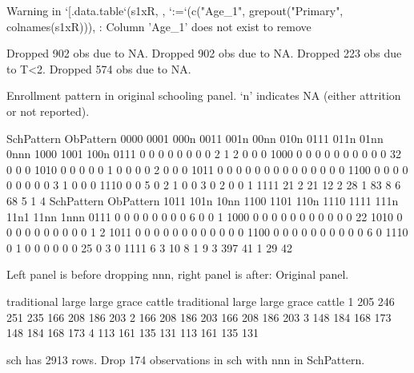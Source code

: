 \begin{Schunk}
\begin{Soutput}
Warning in `[.data.table`(s1xR, , `:=`(c("Age_1", grepout("Primary", colnames(s1xR))), : Column 'Age_1' does not exist to remove
\end{Soutput}
\begin{Soutput}
Dropped 902 obs due to NA.
Dropped 902 obs due to NA.
Dropped 223 obs due to T<2.
Dropped 574 obs due to NA.
\end{Soutput}
\end{Schunk}
Enrollment pattern in original schooling panel. `n' indicates NA (either attrition or not reported).
\begin{Schunk}
\begin{Soutput}
         SchPattern
ObPattern 0000 0001 000n 0011 001n 00nn 010n 0111 011n 01nn 0nnn 1000 1001 100n
     0111    0    0    0    0    0    0    0    0    2    1    2    0    0    0
     1000    0    0    0    0    0    0    0    0    0    0   32    0    0    0
     1010    0    0    0    0    0    1    0    0    0    0    2    0    0    0
     1011    0    0    0    0    0    0    0    0    0    0    0    0    0    0
     1100    0    0    0    0    0    0    0    0    0    3    1    0    0    0
     1110    0    0    5    0    2    1    0    0    3    0    2    0    0    1
     1111   21    2   21   12    2   28    1   83    8    6   68    5    1    4
         SchPattern
ObPattern 1011 101n 10nn 1100 1101 110n 1110 1111 111n 11n1 11nn 1nnn
     0111    0    0    0    0    0    0    0    0    6    0    0    1
     1000    0    0    0    0    0    0    0    0    0    0    0   22
     1010    0    0    0    0    0    0    0    0    0    0    1    2
     1011    0    0    0    0    0    0    0    0    0    0    0    0
     1100    0    0    0    0    0    0    0    0    0    0    6    0
     1110    0    1    0    0    0    0    0    0   25    0    3    0
     1111    6    3   10    8    1    9    3  397   41    1   29   42
\end{Soutput}
\end{Schunk}
Left panel is before dropping \textsf{nnn}, right panel is after: Original panel.
\begin{Schunk}
\begin{Soutput}
  traditional large large grace cattle traditional large large grace cattle
1         205   246         251    235         166   208         186    203
2         166   208         186    203         166   208         186    203
3         148   184         168    173         148   184         168    173
4         113   161         135    131         113   161         135    131
\end{Soutput}
\end{Schunk}
\textsf{sch} has 2913 rows. Drop 174 observations in \textsf{sch} with nnn in \textsf{SchPattern}. 

